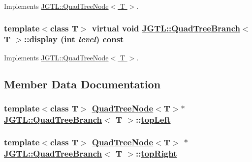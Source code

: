 Implements \hyperlink{class_j_g_t_l_1_1_quad_tree_node_8bf383a824c1b5dc7dc2fff05aeaaec9}{JGTL::Quad\-Tree\-Node$<$ T $>$}.\hypertarget{class_j_g_t_l_1_1_quad_tree_branch_1a9cb0c814af012ad2a1a891b7223179}{
\subsubsection[display]{\setlength{\rightskip}{0pt plus 5cm}template$<$class T$>$ virtual void \hyperlink{class_j_g_t_l_1_1_quad_tree_branch}{JGTL::Quad\-Tree\-Branch}$<$ T $>$::display (int {\em level}) const}}
\label{class_j_g_t_l_1_1_quad_tree_branch_1a9cb0c814af012ad2a1a891b7223179}




Implements \hyperlink{class_j_g_t_l_1_1_quad_tree_node_5d3e714f007be6a1ab507bcda173aede}{JGTL::Quad\-Tree\-Node$<$ T $>$}.

\subsection{Member Data Documentation}
\hypertarget{class_j_g_t_l_1_1_quad_tree_branch_91e216c7605fc50b7174393eb7e70c0a}{
\subsubsection[topLeft]{\setlength{\rightskip}{0pt plus 5cm}template$<$class T$>$ \hyperlink{class_j_g_t_l_1_1_quad_tree_node}{Quad\-Tree\-Node}$<$T$>$$\ast$ \hyperlink{class_j_g_t_l_1_1_quad_tree_branch}{JGTL::Quad\-Tree\-Branch}$<$ T $>$::\hyperlink{class_j_g_t_l_1_1_quad_tree_branch_91e216c7605fc50b7174393eb7e70c0a}{top\-Left}}}
\label{class_j_g_t_l_1_1_quad_tree_branch_91e216c7605fc50b7174393eb7e70c0a}


\hypertarget{class_j_g_t_l_1_1_quad_tree_branch_daedd4440e92bcf7159a0b879e5e028a}{
\subsubsection[topRight]{\setlength{\rightskip}{0pt plus 5cm}template$<$class T$>$ \hyperlink{class_j_g_t_l_1_1_quad_tree_node}{Quad\-Tree\-Node}$<$T$>$ $\ast$ \hyperlink{class_j_g_t_l_1_1_quad_tree_branch}{JGTL::Quad\-Tree\-Branch}$<$ T $>$::\hyperlink{class_j_g_t_l_1_1_quad_tree_branch_daedd4440e92bcf7159a0b879e5e028a}{top\-Right}}}
\label{class_j_g_t_l_1_1_quad_tree_branch_daedd4440e92bcf7159a0b879e5e028a}


